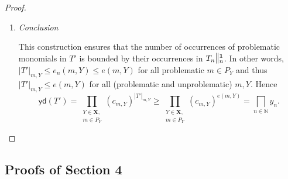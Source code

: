 \documentclass[english,runningheads,a4paper,envcountsame]{llncs}
\newcommand{\Inf}{\bigsqcap}
\newcommand{\Nat}{\mathbb{N}}
\newcommand*{\XX}{{\bm X}}
\newcommand*{\yield}{\mathsf{yd}}
\newcommand*{\varcount}[2]{|{#1}|_{#2}}
\newcommand{\cut}[2]{\scalebox{1}[1.3]{$\|$}\vphantom{|}_{#1}^{#2}}
\newcommand{\one}{\tup 1}
\newcommand*{\tup}[1]{\mathbf{#1}}
\begin{document}
\begin{proof}
\begin{enumerate}
\item \textit{Conclusion}

This construction ensures that the number of occurrences of problematic monomials in $T'$
is bounded by their occurrences in $T_n \cut n \one$.
In other words, $\varcount {T'} {m,Y} \le e_n(m,Y) \le e(m,Y)$ for all problematic $m \in P_Y$
and thus $\varcount {T'} {m,Y} \le e(m,Y)$ for all (problematic and unproblematic) $m,Y$.
Hence
\[
  \yield(T') =
  \prod_{\substack{Y \in \XX,\\m \in P_Y}} (c_{m,Y})^{\varcount {T'} {m,Y}} \ge
  \prod_{\substack{Y \in \XX,\\m \in P_Y}} (c_{m,Y})^{e(m,Y)} =
  \Inf_{n \in \Nat} y_n. \tag*{\qed}
\]
\end{enumerate}
\end{proof}



\subsection{Proofs of Section 4}
\end{document}
